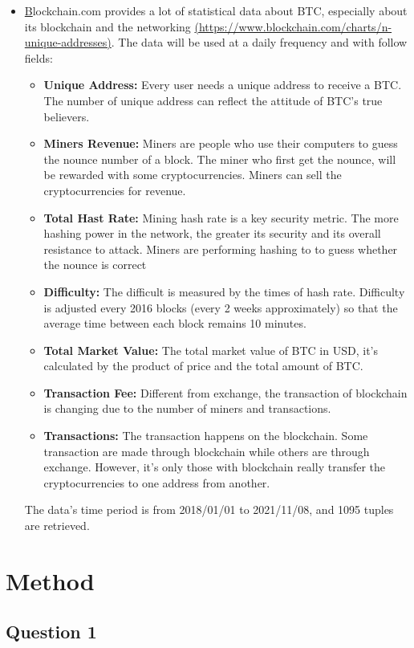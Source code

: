 \documentclass[a4paper]{article}
\begin{document}
\begin{itemize}
    \item \href{https://www.blockchain.com/charts/difficulty}Blockchain.com provides a lot of statistical data about BTC, especially about its blockchain and the networking \href{https://www.blockchain.com/charts/n-unique-addresses}{(https://www.blockchain.com/charts/n-unique-addresses)}. The data will be used at a daily frequency and with follow fields:
    \begin{itemize}
        \item \textbf{Unique Address: } Every user needs a unique address to receive a BTC. The number of unique address can reflect the attitude of BTC's true believers.
        \item \textbf{Miners Revenue: } Miners are people who use their computers to guess the nounce number of a block. The miner who first get the nounce, will be rewarded with some cryptocurrencies. Miners can sell the cryptocurrencies for revenue.
        \item \textbf{Total Hast Rate:} Mining hash rate is a key security metric. The more hashing power in the network, the greater its security and its overall resistance to attack. Miners are performing hashing to to guess whether the nounce is correct
        \item \textbf{Difficulty: }The difficult is measured by the times of hash rate. Difficulty is adjusted every 2016 blocks (every 2 weeks approximately) so that the average time between each block remains 10 minutes.
        \item \textbf{Total Market Value: } The total market value of BTC in USD, it's calculated by the product of price and the total amount of BTC.
        \item \textbf{Transaction Fee: } Different from exchange, the transaction of blockchain is changing due to the number of miners and transactions.
        \item \textbf{Transactions: } The transaction happens on the blockchain. Some transaction are made through blockchain while others are through exchange. However, it's only those with blockchain really transfer the cryptocurrencies to one address from another.
    \end{itemize}
    The data's time period is from 2018/01/01 to 2021/11/08, and 1095 tuples are retrieved.
\end{itemize}
\section{Method}
\subsection{Question 1}
\end{document}
